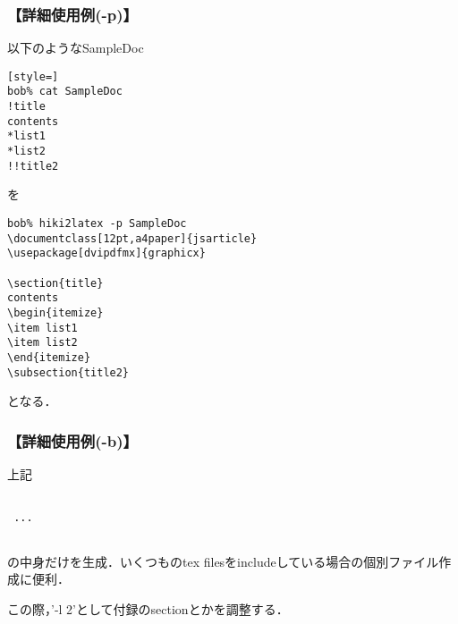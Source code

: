 \subsubsection{【詳細使用例(-p)】}
以下のようなSampleDoc
\begin{lstlisting}[style=]
bob% cat SampleDoc 
!title
contents
*list1
*list2
!!title2
\end{lstlisting}
を
\begin{lstlisting}[style=customTeX]
bob% hiki2latex -p SampleDoc 
\documentclass[12pt,a4paper]{jsarticle}
\usepackage[dvipdfmx]{graphicx}

\section{title}
contents
\begin{itemize}
\item list1
\item list2
\end{itemize}
\subsection{title2}

\end{lstlisting}
となる．

\subsubsection{【詳細使用例(-b)】}
上記
\begin{lstlisting}[style=customTeX]
 
 ...
 
\end{lstlisting}
の中身だけを生成．いくつものtex filesをincludeしている場合の個別ファイル作成に便利．

この際，'-l 2'として付録のsectionとかを調整する．


